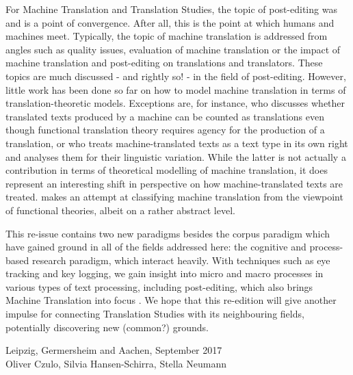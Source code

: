 For Machine Translation and Translation Studies, the topic of post-editing was and is a point of convergence. After all, this is the point at which humans and machines meet. Typically, the topic of machine translation is addressed from angles such as quality issues, evaluation of machine translation or the impact of machine translation and post-editing on translations and translators. These topics are much discussed - and rightly so! - in the field of post-editing. However, little work has been done so far on how to model machine translation in terms of translation-theoretic models. Exceptions are, for instance, \citet{Rozmyslowicz2014} who discusses whether translated texts produced by a machine can be counted as translations even though functional translation theory requires agency for the production of a translation, or \citet{Lapshinova2013} who treats machine-translated texts as a text type in its own right and analyses them for their linguistic variation. While the latter is not actually a contribution in terms of theoretical modelling of machine translation, it does represent an interesting shift in perspective on how machine-translated texts are treated. \citet{Culo2014} makes an attempt at classifying machine translation from the viewpoint of functional theories, albeit on a rather abstract level.
\par

This re-issue contains two new paradigms besides the corpus paradigm which have gained ground in all of the fields addressed here: the cognitive and process-based research paradigm, which interact heavily. With techniques such as eye tracking and key logging, we gain insight into micro and macro processes in various types of text processing, including post-editing, which also brings Machine Translation into focus \cite[see e.g. Carl \& Dragsted, this volume;][]{CarlEtAl2016}. We hope that this re-edition will give another impulse for connecting Translation Studies with its neighbouring fields, potentially discovering new (common?) grounds.

\bigskip
\hfill Leipzig, Germersheim and Aachen, September 2017 \\
\bigskip
\hfill Oliver Czulo, Silvia Hansen-Schirra, Stella Neumann
\sloppy
\printbibliography[heading=subbibliography,notkeyword=this]

